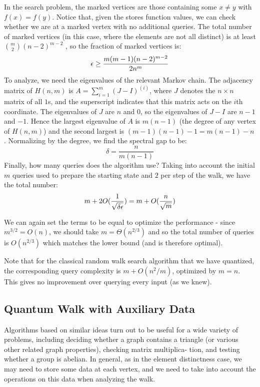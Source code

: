 In the search problem, the marked vertices are those containing some $x \neq y$ with $f(x) = f(y)$. Notice that, given the stores function values, we can check whether we are at a marked vertex with no additional queries. The total number of marked vertices (in this case, where the elements are not all distinct) is at least $\binom{m}{2}(n-2)^{m-2}$ , so the fraction of marked vertices is:
\begin{equation}
    \epsilon \geq \frac{m(m-1)(n-2)^{m-2}}{2n^m}
\end{equation}
To analyze, we need the eigenvalues of the relevant Markov chain. The adjacency matrix of $H(n, m)$ is $A = \sum_{i=1}^m (J-I)^{(i)}$, where $J$ denotes the $n \times n$ matrix of all $1$s, and the superscript indicates that this matrix acts on the $i$th coordinate. The eigenvalues of $J$ are $n$ and 0, so the eigenvalues of $J-I$ are $n-1$ and $-1$. Hence the largest eigenvalue of $A$ is $m(n-1)$ (the degree of any vertex of $H(n, m)$) and the second largest is $(m-1)(n-1)-1 = m(n-1)-n$. Normalizing by the degree, we find the spectral gap to be:
\begin{equation}
    \delta = \frac{n}{m(n-1)}
\end{equation}
Finally, how many queries does the algorithm use? Taking into account the initial $m$ queries used to prepare the starting state and $2$ per step of the walk, we have the total number:
\begin{equation}
    m + 2O(\frac{1}{\sqrt{\delta \epsilon}}) = m + O(\frac{n}{\sqrt{m}})
\end{equation}

We can again set the terms to be equal to optimize the performance - since $m^{3/2} = O(n)$, we should take $m = \Theta(n^{2/3})$ and so the total number of queries is $O(n^{2/3})$ which matches the lower bound (and is therefore optimal).

Note that for the classical random walk search algorithm that we have quantized, the corresponding query complexity is $m + O(n^2/m)$, optimized by $m = n$. This gives no improvement over querying every input (as we knew).


\subsection*{Quantum Walk with Auxiliary Data}
Algorithms based on similar ideas turn out to be useful for a wide variety of problems, including deciding whether a graph contains a triangle (or various other related graph properties), checking matrix multiplica- tion, and testing whether a group is abelian. In general, as in the element distinctness case, we may need to store some data at each vertex, and we need to take into account the operations on this data when analyzing the walk.

